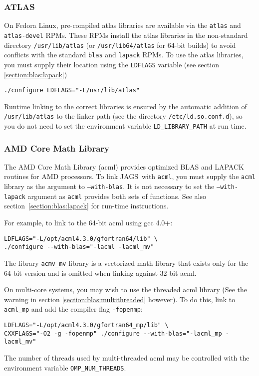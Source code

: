 \documentclass[11pt, a4paper, titlepage]{article}
\newcommand{\JAGS}{\textsf{JAGS}}
\begin{document}
\subsubsection{ATLAS}

On Fedora Linux, pre-compiled atlas libraries are available via the
\texttt{atlas} and \texttt{atlas-devel} RPMs.  These RPMs install the
atlas libraries in the non-standard directory \texttt{/usr/lib/atlas}
(or \texttt{/usr/lib64/atlas} for 64-bit builds) to avoid conflicts
with the standard \texttt{blas} and \texttt{lapack} RPMs. To use the
atlas libraries, you must supply their location using the
\verb+LDFLAGS+ variable (see section \ref{section:blas:lapack})
\begin{verbatim}
./configure LDFLAGS="-L/usr/lib/atlas"
\end{verbatim}
Runtime linking to the correct libraries is ensured by the automatic
addition of \texttt{/usr/lib/atlas} to the linker path (see the directory
\texttt{/etc/ld.so.conf.d}), so you do not need to set the
environment variable \verb+LD_LIBRARY_PATH+ at run time.

\subsubsection{AMD Core Math Library}
\label{section:acml:linux}

The AMD Core Math Library (acml) provides optimized BLAS and LAPACK
routines for AMD processors. To link \JAGS\ with \texttt{acml}, you must
supply the \texttt{acml} library as the argument to \texttt{--with-blas}.
It is not necessary to set the \texttt{--with-lapack} argument
as \texttt{acml} provides both sets of functions. See also
section~\ref{section:blas:lapack} for run-time instructions.

For example, to link to the 64-bit acml using gcc 4.0+:
\begin{verbatim}
LDFLAGS="-L/opt/acml4.3.0/gfortran64/lib" \
./configure --with-blas="-lacml -lacml_mv" 
\end{verbatim}
The library \verb+acmv_mv+ library is a vectorized math library that
exists only for the 64-bit version and is omitted when linking against
32-bit acml.

On multi-core systems, you may wish to use the threaded acml library
(See the warning in section \ref{section:blas:multithreaded} however).
To do this, link to \verb+acml_mp+ and add the compiler flag
\verb+-fopenmp+:
\begin{verbatim}
LDFLAGS="-L/opt/acml4.3.0/gfortran64_mp/lib" \
CXXFLAGS="-O2 -g -fopenmp" ./configure --with-blas="-lacml_mp -lacml_mv" 
\end{verbatim}
The number of threads used by multi-threaded acml may be controlled
with the environment variable \verb+OMP_NUM_THREADS+.
\end{document}
